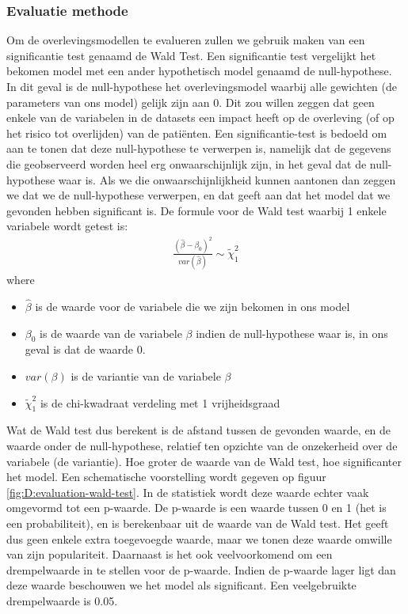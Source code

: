 \begin{abstract*}
\subsubsection{Evaluatie methode}
Om de overlevingsmodellen te evalueren zullen we gebruik maken van een significantie test genaamd de Wald Test. Een significantie test vergelijkt het bekomen model met een ander hypothetisch model genaamd de null-hypothese. In dit geval is de null-hypothese het overlevingsmodel waarbij alle gewichten (de parameters van ons model) gelijk zijn aan 0. Dit zou willen zeggen dat geen enkele van de variabelen in de datasets een impact heeft op de overleving (of op het risico tot overlijden) van de pati\"enten. Een significantie-test is bedoeld om aan te tonen dat deze null-hypothese te verwerpen is, namelijk dat de gegevens die geobserveerd worden heel erg onwaarschijnlijk zijn, in het geval dat de null-hypothese waar is. Als we die onwaarschijnlijkheid kunnen aantonen dan zeggen we dat we de null-hypothese verwerpen, en dat geeft aan dat het model dat we gevonden hebben significant is. De formule voor de Wald test waarbij 1 enkele variabele wordt getest is:
\begin{equation}
\begin{split}
\frac{(\hat{\beta}-\beta_{0})^{2}}{var(\hat{\beta})} \sim \tilde{\chi}^{2}_{1}
\end{split}
\end{equation}
where
\begin{itemize}
	\item $\hat{\beta}$ is de waarde voor de variabele die we zijn bekomen in ons model
	\item $\beta_{0}$ is de waarde van de variabele $\beta$ indien de null-hypothese waar is, in ons geval is dat de waarde 0.
	\item $var(\beta)$ is de variantie van de variabele $\beta$
	\item $\tilde{\chi}^{2}_{1}$ is de chi-kwadraat verdeling met 1 vrijheidsgraad
\end{itemize}
Wat de Wald test dus berekent is de afstand tussen de gevonden waarde, en de waarde onder de null-hypothese, relatief ten opzichte van de onzekerheid over de variabele (de variantie). Hoe groter de waarde van de Wald test, hoe significanter het model. Een schematische voorstelling wordt gegeven op figuur \ref{fig:D:evaluation-wald-test}. In de statistiek wordt deze waarde echter vaak omgevormd tot een p-waarde. De p-waarde is een waarde tussen 0 en 1 (het is een probabiliteit), en is berekenbaar uit de waarde van de Wald test. Het geeft dus geen enkele extra toegevoegde waarde, maar we tonen deze waarde omwille van zijn populariteit. Daarnaast is het ook veelvoorkomend om een drempelwaarde in te stellen voor de p-waarde. Indien de p-waarde lager ligt dan deze waarde beschouwen we het model als significant. Een veelgebruikte drempelwaarde is 0.05.

\end{abstract*}
